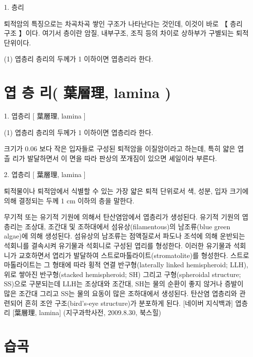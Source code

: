 \documentclass[12pt, a4paper, oneside]{book}
\begin{document}
1. 		층리

퇴적암의 특징으로는 차곡차곡 쌓인 구조가 나타난다는 것인데, 이것이 바로 【 층리 구조 】이다. 여기서 층이란 암질, 내부구조, 조직 등의 차이로 상하부가 구별되는 퇴적단위이다.

(1) 엽층리
층리의 두께가 1  이하이면 엽층리라 한다.







	\newpage  \null
	\section{엽 층 리( 葉層理, lamina )}




1. 		엽층리 [ 葉層理, lamina ] 

(1) 엽층리
층리의 두께가 1  이하이면 엽층리라 한다.

크기가 0.06 보다 작은 입자들로 구성된 퇴적암을 이질암이라고 하는데, 특히 얇은 엽츨 리가 발달하면서 이 면을 따라 판상의 쪼개짐이 있으면 셰일이라 부른다.



2. 엽층리 [ 葉層理, lamina ] 

퇴적물이나 퇴적암에서 식별할 수 있는 가장 얇은 퇴적 단위로서 색, 성분, 입자 크기에 의해 결정되는 두께 1 cm 이하의 층을 말한다. 

무기적 또는 유기적 기원에 의해서 탄산염암에서 엽층리가 생성된다. 유기적 기원의 엽층리는 조상대, 조간대 및 조하대에서 섬유상(filamentous)의 남조류(blue green algae)에 의해 생성된다. 섬유상의 남조류는 점액질로서 파도나 조석에 의해 운반되는 석회니를 결속시켜 유기물과 석회니로 구성된 엽리를 형성한다. 이러한 유기물과 석회니가 교호하면서 엽리가 발달하여 스트로마톨라이트(stromatolite)를 형성한다. 스트로마톨라이트는 그 형태에 따라 횡적 연결 반구형(laterally linked hemispheroid; LLH), 위로 쌓아진 반구형(stacked hemispheroid; SH) 그리고 구형(spheroidal structure; SS)으로 구분되는데 LLH는 조상대와 조간대, SH는 물의 순환이 좋지 않거나 증발이 많은 조간대 그리고 SS는 물의 요동이 많은 조하대에서 생성된다. 탄산염 엽층리와 관련되어 흔히 조안 구조(bird's-eye structure)가 분포하게 된다.
[네이버 지식백과] 엽층리 [葉層理, lamina] (지구과학사전, 2009.8.30, 북스힐)





	\newpage  \null
	\section{습곡}
\end{document}
